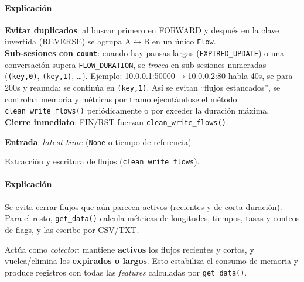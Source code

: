 \paragraph{Explicación}
\textbf{Evitar duplicados}: al buscar primero en FORWARD y después en la clave invertida (REVERSE) se agrupa A$\leftrightarrow$B en un único \texttt{Flow}. \\
\textbf{Sub‑sesiones con \texttt{count}}: cuando hay pausas largas (\texttt{EXPIRED\_UPDATE}) o una conversación supera \texttt{FLOW\_DURATION}, se \emph{trocea} en sub‑sesiones numeradas (\texttt{(key,0)}, \texttt{(key,1)}, \ldots). Ejemplo: 10.0.0.1:50000$\rightarrow$10.0.0.2:80 habla 40s, se para 200s y reanuda; se continúa en \texttt{(key,1)}. Así se evitan “flujos estancados”, se controlan memoria y métricas por tramo ejecutándose el método  \texttt{clean\_write\_flows()} periódicamente o por exceder la duración máxima. \\
\textbf{Cierre inmediato}: FIN/RST fuerzan \texttt{clean\_write\_flows()}.


\begin{algorithm}[H]
\SetAlgoLined
{}
\textbf{Entrada}: $latest\_time$ (\texttt{None} o tiempo de referencia)\;
\caption{Extracción y escritura de flujos (\texttt{clean\_write\_flows}).}
\label{alg:clean_write_flows}
\end{algorithm}

\paragraph{Explicación}
Se evita cerrar flujos que aún parecen activos (recientes y de corta duración). Para el resto, \texttt{get\_data()} calcula métricas de longitudes, tiempos, tasas y conteos de flags, y las escribe por CSV/TXT.

Actúa como \textit{colector}: mantiene \textbf{activos} los flujos recientes y cortos, y vuelca/elimina los \textbf{expirados o largos}. Esto estabiliza el consumo de memoria y produce registros con todas las \textit{features} calculadas por \texttt{get\_data()}.

